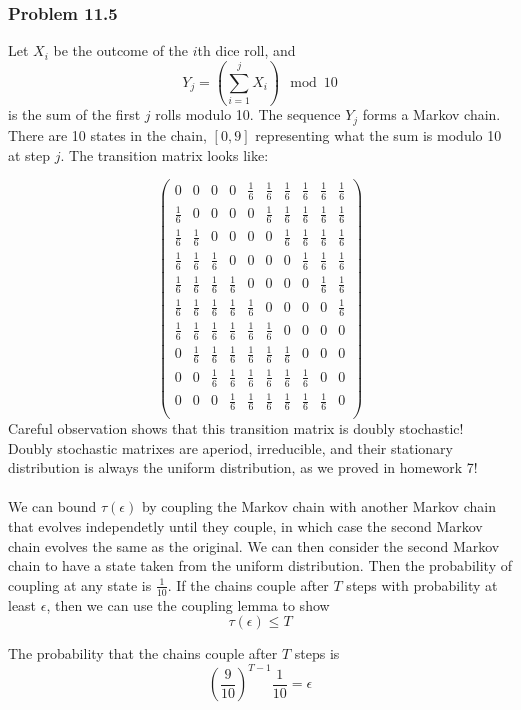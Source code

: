\documentclass[12pt,letterpaper]{article}
\newcommand\p{\frac{1}{6}}
\newenvironment{answer}[1]{
  \subsubsection*{Problem #1}
}{\newpage}
\begin{document}
\begin{answer}{11.5}
Let $X_i$ be the outcome of the $i$th dice roll, and
	$$Y_j = \left(\sum_{i=1}^j X_i\right) \mod{10}$$
is the sum of the first $j$ rolls modulo 10. The sequence $Y_j$ forms a Markov chain. There are 10 states in the chain, $[0,9]$ representing what the sum is modulo 10 at step $j$. The transition matrix looks like:

$$
\left(
	\begin{array}{cccccccccc}
	0  & 0  & 0  & 0  & \p & \p & \p & \p & \p & \p \\
	\p & 0  & 0  & 0  & 0  & \p & \p & \p & \p & \p \\
	\p & \p & 0  & 0  & 0  & 0  & \p & \p & \p & \p \\
	\p & \p & \p & 0  & 0  & 0  & 0  & \p & \p & \p \\
	\p & \p & \p & \p & 0  & 0  & 0  & 0  & \p & \p \\
	\p & \p & \p & \p & \p & 0  & 0  & 0  & 0  & \p \\
	\p & \p & \p & \p & \p & \p & 0  & 0  & 0  & 0  \\
	0  & \p & \p & \p & \p & \p & \p & 0  & 0  & 0  \\
	0  & 0  & \p & \p & \p & \p & \p & \p & 0  & 0  \\
	0  & 0  & 0  & \p & \p & \p & \p & \p & \p & 0 \\
	\end{array}
\right)
$$
Careful observation shows that this transition matrix is doubly stochastic! Doubly stochastic matrixes are aperiod, irreducible, and their stationary distribution is always the uniform distribution, as we proved in homework 7!\\\\

We can bound $\tau(\epsilon)$ by coupling the Markov chain with another Markov chain that evolves independetly until they couple, in which case the second Markov chain evolves the same as the original. We can then consider the second Markov chain to have a state taken from the uniform distribution. Then the probability of coupling at any state is $\frac{1}{10}$. If the chains couple after $T$ steps with probability at least $\epsilon$, then we can use the coupling lemma to show
	$$ \tau(\epsilon) \le T$$

The probability that the chains couple after $T$ steps is
	$$\left( \frac{9}{10} \right)^{T-1} \frac{1}{10} = \epsilon$$

\end{answer}
\end{document}
